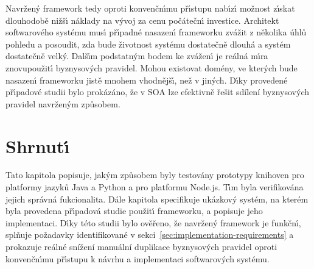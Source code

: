 Navržen\'y framework tedy oproti konvenčn\'{\i}mu př\'{\i}stupu nab\'{\i}z\'{\i} možnost z\'{\i}skat dlouhodobě
nižš\'{\i} náklady na v\'yvoj za cenu počátečn\'{\i} investice. Architekt softwarového systému mus\'{\i} př\'{\i}padné nasazen\'{\i}
frameworku zvážit z několika úhlů pohledu a posoudit, zda bude životnost systému dostatečně dlouhá a systém
dostatečně velk\'y. Dalš\'{\i}m podstatn\'ym bodem ke zvážen\'{\i} je reálná m\'{\i}ra znovupoužit\'{\i} byznysov\'ych pravidel.
Mohou existovat domény, ve kter\'ych bude nasazen\'{\i} frameworku jistě mnohem vhodnějš\'{\i}, než v jin\'ych.
D\'{\i}ky provedené př\'{\i}padové studii bylo prokázáno, že v \gls{SOA} lze efektivně řešit sdílení byznysov\'ych pravidel
navržen\'ym způsobem.

\section{Shrnut\'{\i}}

Tato kapitola popisuje, jak\'ym způsobem byly testovány prototypy knihoven
pro platformy jazyků Java a Python a pro platformu Node.js. T\'{\i}m byla verifikována
jejich správná fukcionalita. Dále kapitola specifikuje ukázkový systém, na kterém byla
provedena př\'{\i}padová studie použit\'{\i} frameworku, a popisuje jeho implementaci.
D\'{\i}ky této studii bylo ověřeno, že navržen\'y framework je funkčn\'{\i},
splňuje požadavky identifikované v sekci~\ref{sec:implementation-requirements}
a prokazuje reálné snížení manuální duplikace byznysových pravidel oproti
konvenčn\'{\i}mu př\'{\i}stupu k návrhu a implementaci softwarov\'ych systému.
